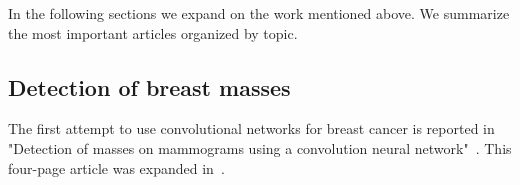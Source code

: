 
In the following sections we expand on the work mentioned above. We summarize the most important articles organized by topic. %

\begin{comment}
Separated in blocks:
	1. Initial mass: Sahiran 1996 (michigan)
	2. Intial microcalc detection: Lo 1995- Lo 1998 (georgetown/both)
	3. Optimal architecture for microcalc: Gurcan 2000-Gurcan 2002 (michigan)
	4. CAD for microcalcification in FFDM. Ge 2007 (CAD for masses didn't use Convnets, used LDA and rule-based classifiers). (michigan)
	5. Late mass diagnosis
\end{comment}

\subsection{Detection of breast masses}
The first attempt to use convolutional networks for breast cancer is reported in "Detection of masses on mammograms using a convolution neural network"~\cite{Wei1995}. This four-page article was expanded in~\cite{Sahiner1996}.

